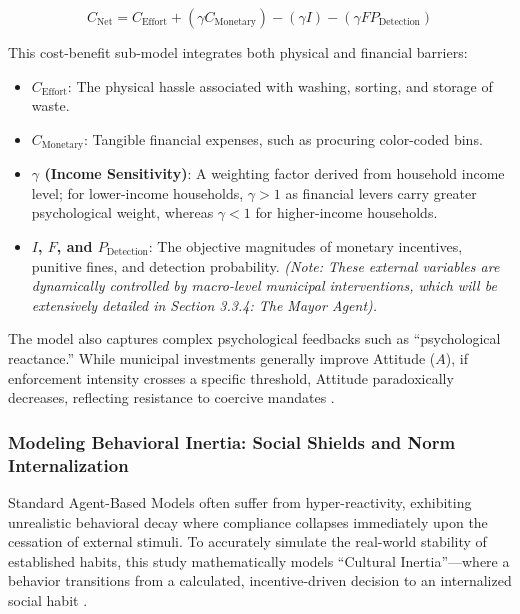 \begin{equation}
    C_{\mathrm{Net}} = C_{\mathrm{Effort}} + (\gamma C_{\mathrm{Monetary}}) - (\gamma I) - (\gamma F P_{\mathrm{Detection}})
    \label{eq:net_disutility}
\end{equation}

This cost-benefit sub-model integrates both physical and financial barriers:
\begin{itemize}
    \item \textbf{$C_{\mathrm{Effort}}$}: The physical hassle associated with washing, sorting, and storage of waste.
    \item \textbf{$C_{\mathrm{Monetary}}$}: Tangible financial expenses, such as procuring color-coded bins.
    \item \textbf{$\gamma$ (Income Sensitivity)}: A weighting factor derived from household income level; for lower-income households, $\gamma > 1$ as financial levers carry greater psychological weight, whereas $\gamma < 1$ for higher-income households.
    \item \textbf{$I$, $F$, and $P_{\mathrm{Detection}}$}: The objective magnitudes of monetary incentives, punitive fines, and detection probability. \textit{(Note: These external variables are dynamically controlled by macro-level municipal interventions, which will be extensively detailed in Section 3.3.4: The Mayor Agent).}
\end{itemize}

The model also captures complex psychological feedbacks such as ``psychological reactance.'' While municipal investments generally improve Attitude ($A$), if enforcement intensity crosses a specific threshold, Attitude paradoxically decreases, reflecting resistance to coercive mandates \citep{LoanBalanay2023}.

\subsubsection{Modeling Behavioral Inertia: Social Shields and Norm Internalization}

Standard Agent-Based Models often suffer from hyper-reactivity, exhibiting unrealistic behavioral decay where compliance collapses immediately upon the cessation of external stimuli. To accurately simulate the real-world stability of established habits, this study mathematically models ``Cultural Inertia''---where a behavior transitions from a calculated, incentive-driven decision to an internalized social habit \citep{Corcoran2020}.

